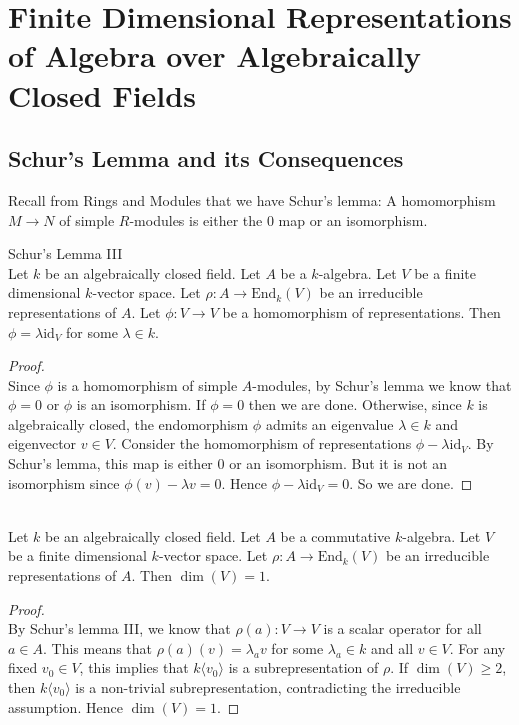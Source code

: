 \documentclass[a4paper]{article}
\begin{document}
\pagebreak
\section{Finite Dimensional Representations of Algebra over Algebraically Closed Fields}
\subsection{Schur's Lemma and its Consequences}
Recall from Rings and Modules that we have Schur's lemma: A homomorphism $M\to N$ of simple $R$-modules is either the $0$ map or an isomorphism. 

\begin{lmm}{Schur's Lemma III}{}\\
Let $k$ be an algebraically closed field. Let $A$ be a $k$-algebra. Let $V$ be a finite dimensional $k$-vector space. Let $\rho:A\to\text{End}_k(V)$ be an irreducible representations of $A$. Let $\phi:V\to V$ be a homomorphism of representations. Then $\phi=\lambda\text{id}_V$ for some $\lambda\in k$. 
\begin{proof}\\
Since $\phi$ is a homomorphism of simple $A$-modules, by Schur's lemma we know that $\phi=0$ or $\phi$ is an isomorphism. If $\phi=0$ then we are done. Otherwise, since $k$ is algebraically closed, the endomorphism $\phi$ admits an eigenvalue $\lambda\in k$ and eigenvector $v\in V$. Consider the homomorphism of representations $\phi-\lambda\text{id}_V$. By Schur's lemma, this map is either $0$ or an isomorphism. But it is not an isomorphism since $\phi(v)-\lambda v=0$. Hence $\phi-\lambda\text{id}_V=0$. So we are done. 
\end{proof}
\end{lmm}

\begin{crl}{}{}\\
Let $k$ be an algebraically closed field. Let $A$ be a commutative $k$-algebra. Let $V$ be a finite dimensional $k$-vector space. Let $\rho:A\to\text{End}_k(V)$ be an irreducible representations of $A$. Then $\dim(V)=1$. 
\begin{proof}\\
By Schur's lemma III, we know that $\rho(a):V\to V$ is a scalar operator for all $a\in A$. This means that $\rho(a)(v)=\lambda_av$ for some $\lambda_a\in k$ and all $v\in V$. For any fixed $v_0\in V$, this implies that $k\langle v_0\rangle$ is a subrepresentation of $\rho$. If $\dim(V)\geq 2$, then $k\langle v_0\rangle$ is a non-trivial subrepresentation, contradicting the irreducible assumption. Hence $\dim(V)=1$. 
\end{proof}	
\end{crl}
\end{document}

